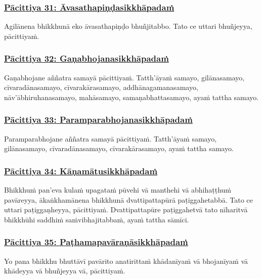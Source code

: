 \subsubsection*{\hyperref[exp31]{Pācittiya 31: Āvasathapiṇḍasikkhāpadaṁ}}
\label{pac31}

Agilānena bhikkhunā eko āvasathapiṇḍo bhuñjitabbo. Tato ce uttari bhuñjeyya, pācittiyaṁ.

\subsubsection*{\hyperref[exp32]{Pācittiya 32: Gaṇabhojanasikkhāpadaṁ}}
\label{pac32}

Gaṇabhojane aññatra samayā pācittiyaṁ. Tatth'āyaṁ samayo, gilānasamayo, cīvaradānasamayo, cīvarakārasamayo, addhānagamanasamayo, nāv'ābhiruhanasamayo, mahāsamayo, samaṇabhattasamayo, ayaṁ tattha samayo.

\subsubsection*{\hyperref[exp33]{Pācittiya 33: Paramparabhojanasikkhāpadaṁ}}
\label{pac33}

Paramparabhojane aññatra samayā pācittiyaṁ. Tatth'āyaṁ samayo, gilānasamayo, cīvaradānasamayo, cīvarakārasamayo, ayaṁ tattha samayo.

\subsubsection*{\hyperref[exp34]{Pācittiya 34: Kāṇamātusikkhāpadaṁ}}
\label{pac34}

Bhikkhuṁ pan'eva kulaṁ upagataṁ pūvehi vā manthehi vā abhihaṭṭhuṁ pavāreyya, ākaṅkhamānena bhikkhunā dvattipattapūrā paṭiggahetabbā. Tato ce uttari paṭiggaṇheyya, pācittiyaṁ. Dvattipattapūre paṭiggahetvā tato nīharitvā bhikkhūhi saddhiṁ saṁvibhajitabbaṁ, ayaṁ tattha sāmīci.

\subsubsection*{\hyperref[exp35]{Pācittiya 35: Paṭhamapavāraṇāsikkhāpadaṁ}}
\label{pac35}

Yo pana bhikkhu bhuttāvī pavārito anatirittaṁ khādanīyaṁ vā bhojanīyaṁ vā khādeyya vā bhuñjeyya vā, pācittiyaṁ.

